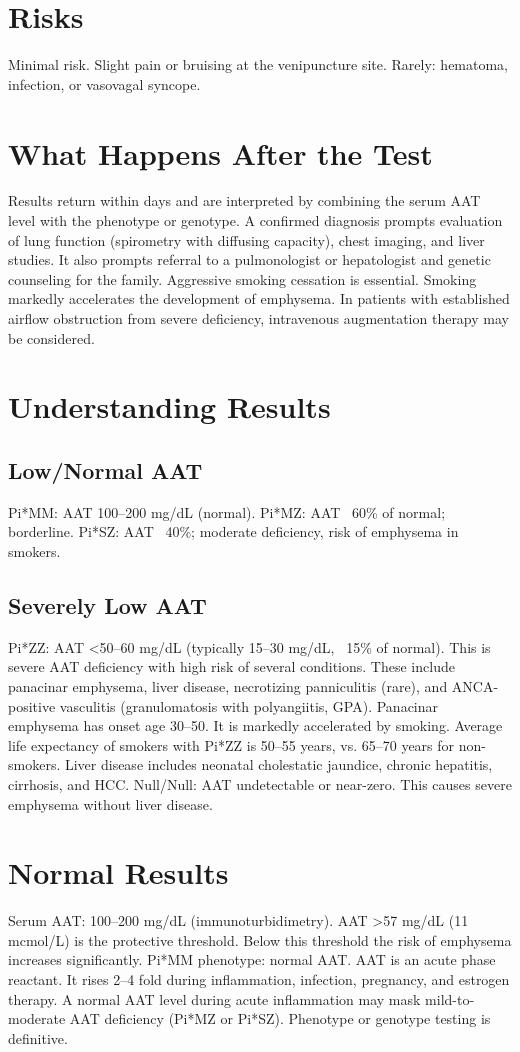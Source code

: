 \section*{Risks}
Minimal risk. Slight pain or bruising at the venipuncture site. Rarely: hematoma, infection, or vasovagal syncope.
\section*{What Happens After the Test}
Results return within days and are interpreted by combining the serum AAT level with the phenotype or genotype. A confirmed diagnosis prompts evaluation of lung function (spirometry with diffusing capacity), chest imaging, and liver studies. It also prompts referral to a pulmonologist or hepatologist and genetic counseling for the family. Aggressive smoking cessation is essential. Smoking markedly accelerates the development of emphysema. In patients with established airflow obstruction from severe deficiency, intravenous augmentation therapy may be considered.
\section*{Understanding Results}
\subsection*{Low/Normal AAT}
Pi*MM: AAT 100--200 mg/dL (normal). Pi*MZ: AAT ~60\% of normal; borderline. Pi*SZ: AAT ~40\%; moderate deficiency, risk of emphysema in smokers.
\subsection*{Severely Low AAT}
Pi*ZZ: AAT <50--60 mg/dL (typically 15--30 mg/dL, ~15\% of normal). This is severe AAT deficiency with high risk of several conditions. These include panacinar emphysema, liver disease, necrotizing panniculitis (rare), and ANCA-positive vasculitis (granulomatosis with polyangiitis, GPA). Panacinar emphysema has onset age 30--50. It is markedly accelerated by smoking. Average life expectancy of smokers with Pi*ZZ is 50--55 years, vs. 65--70 years for non-smokers. Liver disease includes neonatal cholestatic jaundice, chronic hepatitis, cirrhosis, and HCC. Null/Null: AAT undetectable or near-zero. This causes severe emphysema without liver disease.
\section*{Normal Results}
Serum AAT: 100--200 mg/dL (immunoturbidimetry). AAT >57 mg/dL (11 mcmol/L) is the protective threshold. Below this threshold the risk of emphysema increases significantly. Pi*MM phenotype: normal AAT. AAT is an acute phase reactant. It rises 2--4 fold during inflammation, infection, pregnancy, and estrogen therapy. A normal AAT level during acute inflammation may mask mild-to-moderate AAT deficiency (Pi*MZ or Pi*SZ). Phenotype or genotype testing is definitive.
